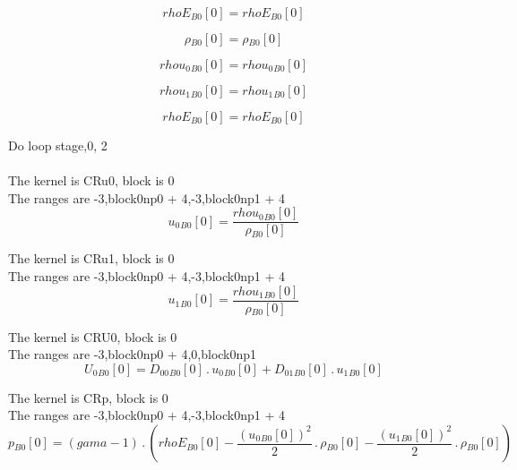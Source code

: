 \documentclass{article}
\begin{document}
\begin{dmath}{rhoE{_{B0}}}[{0}] = {rhoE{_{B0}}}[{0}]\end{dmath}

\begin{dmath}{\rho{_{B0}}}[{0}] = {\rho{_{B0}}}[{0}]\end{dmath}

\begin{dmath}{rhou_{0}{_{B0}}}[{0}] = {rhou_{0}{_{B0}}}[{0}]\end{dmath}

\begin{dmath}{rhou_{1}{_{B0}}}[{0}] = {rhou_{1}{_{B0}}}[{0}]\end{dmath}

\begin{dmath}{rhoE{_{B0}}}[{0}] = {rhoE{_{B0}}}[{0}]\end{dmath}

\noindent Do loop stage,0, 2\\
\\\noindent The kernel is CRu0, block is 0\\\noindent The ranges are -3,block0np0 + 4,-3,block0np1 + 4\\\begin{dmath}{u_{0}{_{B0}}}[{0}] = \frac{{rhou_{0}{_{B0}}}[{0}]}{{\rho{_{B0}}}[{0}]}\end{dmath}

\noindent The kernel is CRu1, block is 0\\\noindent The ranges are -3,block0np0 + 4,-3,block0np1 + 4\\\begin{dmath}{u_{1}{_{B0}}}[{0}] = \frac{{rhou_{1}{_{B0}}}[{0}]}{{\rho{_{B0}}}[{0}]}\end{dmath}

\noindent The kernel is CRU0, block is 0\\\noindent The ranges are -3,block0np0 + 4,0,block0np1\\\begin{dmath}{U_{0}{_{B0}}}[{0}] = {D_{00}{_{B0}}}[{0}] \,.\, {u_{0}{_{B0}}}[{0}] + {D_{01}{_{B0}}}[{0}] \,.\, {u_{1}{_{B0}}}[{0}]\end{dmath}

\noindent The kernel is CRp, block is 0\\\noindent The ranges are -3,block0np0 + 4,-3,block0np1 + 4\\\begin{dmath}{p{_{B0}}}[{0}] = \left(gama - 1\right) \,.\, \left({rhoE{_{B0}}}[{0}] - \frac{\left({u_{0}{_{B0}}}[{0}] \right)^{2}}{2} \,.\, {\rho{_{B0}}}[{0}] - \frac{\left({u_{1}{_{B0}}}[{0}] \right)^{2}}{2} \,.\, 
{\rho{_{B0}}}[{0}]\right)\end{dmath}
\end{document}
